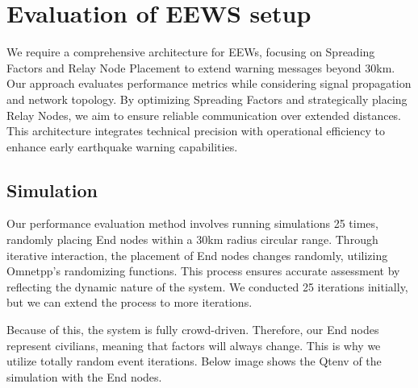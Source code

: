 

\section{Evaluation of EEWS setup}\label{ch:eews}

We require a comprehensive architecture for EEWs, focusing on Spreading Factors and Relay Node Placement to extend warning messages beyond 30km. Our approach evaluates performance metrics while considering signal propagation and network topology. By optimizing Spreading Factors and strategically placing Relay Nodes, we aim to ensure reliable communication over extended distances. This architecture integrates technical precision with operational efficiency to enhance early earthquake warning capabilities.\\

\subsection{Simulation}
\label{sec:sim}

Our performance evaluation method involves running simulations 25 times, randomly placing End nodes within a 30km radius circular range. Through iterative interaction, the placement of End nodes changes randomly, utilizing Omnetpp's randomizing functions. This process ensures accurate assessment by reflecting the dynamic nature of the system. We conducted 25 iterations initially, but we can extend the process to more iterations.

Because of this, the system is fully crowd-driven. Therefore, our End nodes represent civilians, meaning that factors will always change. This is why we utilize totally random event iterations. Below image shows the Qtenv of the simulation with the End nodes. 


